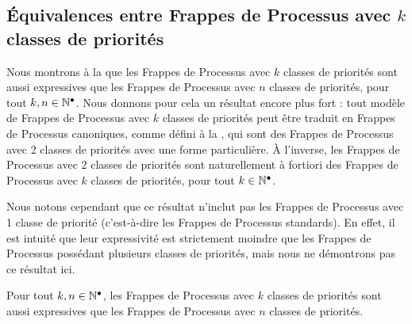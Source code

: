 \subsection{Équivalences entre Frappes de Processus avec $k$ classes de priorités}

Nous montrons à la  que les Frappes de Processus avec $k$ classes
de priorités sont aussi expressives que les Frappes de Processus avec $n$ classes de
priorités, pour tout $k, n \in \mathbb{N}^\bullet$.
Nous donnons pour cela un résultat encore plus fort : tout modèle de Frappes de Processus avec $k$
classes de priorités peut être traduit en Frappes de Processus canoniques,
comme défini à la ,
qui sont des Frappes de Processus avec 2 classes de priorités
avec une forme particulière.
À l'inverse, les Frappes de Processus avec 2 classes de priorités sont
naturellement à fortiori
des Frappes de Processus avec $k$ classes de priorités, pour tout $k \in \mathbb{N}^\bullet$.

Nous notons cependant que ce résultat n'inclut pas les Frappes de Processus
avec 1 classe de priorité (c'est-à-dire les Frappes de Processus standards).
En effet, il est intuité que leur expressivité est strictement moindre
que les Frappes de Processus possédant plusieurs classes de priorités,
mais nous ne démontrons pas ce résultat ici.

\begin{theorem}
  Pour tout $k, n \in \mathbb{N}^\bullet$, les Frappes de Processus avec $k$ classes de priorités
  sont aussi expressives que les Frappes de Processus avec $n$ classes de priorités.
\end{theorem}


